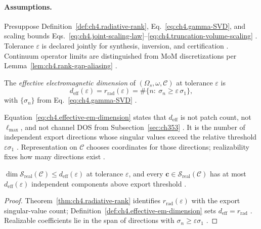 \paragraph{Assumptions.}
Presuppose Definition~\ref{def:ch4.radiative-rank}, Eq.~\eqref{eq:ch4.gamma-SVD}, and scaling bounds
Eqs.~\eqref{eq:ch4.joint-scaling-law}--\eqref{eq:ch4.truncation-volume-scaling} \cite{harrington2001,devaney2004,hansen1988}. Tolerance
\(\varepsilon\) is declared jointly for synthesis, inversion, and certification \cite{stratton1941,collin2001}. Continuum operator limits
are distinguished from MoM discretizations per Lemma~\ref{lem:ch4.rank-gap-aliasing} \cite{harrington2001,devaney2004}.

\begin{definition}
\label{def:ch4.effective-em-dimension}
The \emph{effective electromagnetic dimension} of \((\Omega_{s},\omega,\mathcal{C})\) at tolerance \(\varepsilon\) is
\begin{equation}
\label{eq:ch4.effective-em-dimension}
d_{\mathrm{eff}}(\varepsilon)
=
r_{\mathrm{rad}}(\varepsilon)
=
\#\big\{n:\ \sigma_{n}\ge\varepsilon\,\sigma_{1}\big\},
\end{equation}
with \(\{\sigma_{n}\}\) from Eq.~\eqref{eq:ch4.gamma-SVD} \cite{stratton1941,harrington2001,hansen1988}.
\end{definition}

Equation~\eqref{eq:ch4.effective-em-dimension} states that \(d_{\mathrm{eff}}\) is not patch count, not \(\ell_{\max}\), and not channel
DOS from Subsection~\ref{sec:ch353} \cite{hansen1988,harrington2001,devaney2004}. It is the number of independent export directions whose
singular values exceed the relative threshold \(\varepsilon\sigma_{1}\) \cite{stratton1941,jackson1999,collin2001}. Representation on
\(\mathcal{C}\) chooses coordinates for those directions; realizability fixes how many directions exist \cite{hansen1988,devaney2004}.

\begin{theorem}
\label{thm:ch4.dimension-bounds-realizability}
\(\dim\mathcal{S}_{\mathrm{real}}(\mathcal{C})\le d_{\mathrm{eff}}(\varepsilon)\) at tolerance \(\varepsilon\), and every
\(\mathbf{c}\in\mathcal{S}_{\mathrm{real}}(\mathcal{C})\) has at most \(d_{\mathrm{eff}}(\varepsilon)\) independent components above export
threshold \cite{stratton1941,harrington2001,devaney2004,hansen1988}.
\end{theorem}
\begin{proof}
Theorem~\ref{thm:ch4.radiative-rank} identifies \(r_{\mathrm{rad}}(\varepsilon)\) with the export singular-value count; Definition~\ref{def:ch4.effective-em-dimension}
sets \(d_{\mathrm{eff}}=r_{\mathrm{rad}}\) \cite{harrington2001,stratton1941,devaney2004}. Realizable coefficients lie in the span of
directions with \(\sigma_{n}\ge\varepsilon\sigma_{1}\) \cite{hansen1988,jackson1999}.
\end{proof}

